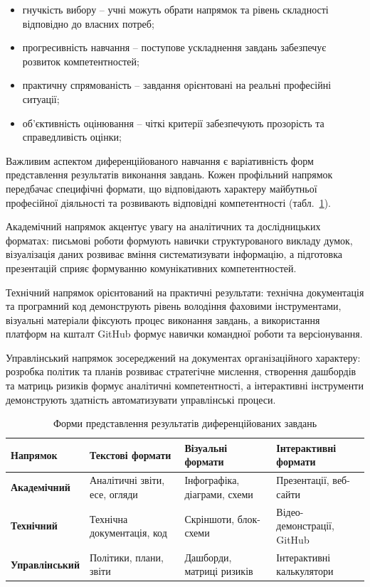 \begin{itemize}
    \item 
гнучкість вибору -- учні можуть обрати напрямок та рівень складності відповідно до власних потреб;
    \item 
прогресивність навчання -- поступове ускладнення завдань забезпечує розвиток компетентностей;
    \item 
практичну спрямованість -- завдання орієнтовані на реальні професійні ситуації;
    \item 
об'єктивність оцінювання -- чіткі критерії забезпечують прозорість та справедливість оцінки;
\end{itemize}

Важливим аспектом диференційованого навчання є варіативність форм представлення результатів виконання завдань. Кожен профільний напрямок передбачає специфічні формати, що відповідають характеру майбутньої професійної діяльності та розвивають відповідні компетентності (табл.~\ref{tab:formy_rezultativ}).

Академічний напрямок акцентує увагу на аналітичних та дослідницьких форматах: письмові роботи формують навички структурованого викладу думок, візуалізація даних розвиває вміння систематизувати інформацію, а підготовка презентацій сприяє формуванню комунікативних компетентностей.

Технічний напрямок орієнтований на практичні результати: технічна документація та програмний код демонструють рівень володіння фаховими інструментами, візуальні матеріали фіксують процес виконання завдань, а використання платформ на кшталт GitHub формує навички командної роботи та версіонування.

Управлінський напрямок зосереджений на документах організаційного характеру: розробка політик та планів розвиває стратегічне мислення, створення дашбордів та матриць ризиків формує аналітичні компетентності, а інтерактивні інструменти демонструють здатність автоматизувати управлінські процеси.

\begin{table}[h!]
\caption{Форми представлення результатів диференційованих завдань}
\label{tab:formy_rezultativ}
\centering
\begin{tabular}{|m{}|m{}|m{}|m{}|}
\hline
\textbf{Напрямок} & \textbf{Текстові формати} & \textbf{Візуальні формати} & \textbf{Інтерактивні формати} \\ \hline
\textbf{Академічний} & Аналітичні звіти, есе, огляди & Інфографіка, діаграми, схеми & Презентації, веб-сайти \\ \hline
\textbf{Технічний} & Технічна документація, код & Скріншоти, блок-схеми & Відео-демонстрації, GitHub \\ \hline
\textbf{Управлінський} & Політики, плани, звіти & Дашборди, матриці ризиків & Інтерактивні калькулятори \\ \hline
\end{tabular}
\end{table}

